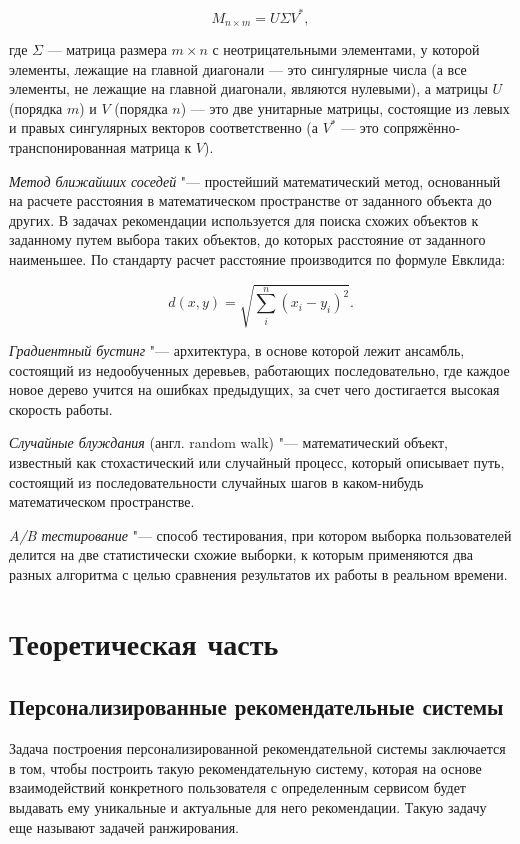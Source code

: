 \documentclass[bachelor, och, coursework]{SCWorks}
\begin{document}
\begin{equation}
    M_{n\times m} = U\Sigma V^*,
\end{equation}

где $\Sigma$  — матрица размера $m\times n$ с неотрицательными элементами, у которой элементы, лежащие на главной диагонали — это сингулярные числа (а все элементы, не лежащие на главной диагонали, являются нулевыми), а матрицы 
$U$ (порядка $m$) и $V$ (порядка $n$) — это две унитарные матрицы, состоящие из левых и правых сингулярных векторов соответственно (а
$V^*$ — это сопряжённо-транспонированная матрица к $V$).

\textit{Метод ближайших соседей} "--- простейший математический метод, основанный на расчете расстояния
в математическом пространстве от заданного объекта до других. В задачах рекомендации используется для поиска
схожих объектов к заданному путем выбора таких объектов, до которых расстояние от заданного наименьшее.
По стандарту расчет расстояние производится по формуле Евклида:

\begin{equation}
    d(x, y) = \sqrt{\sum_i^n (x_i - y_i)^2}.
\end{equation}

\textit{Градиентный бустинг} "--- архитектура, в основе которой лежит ансамбль, состоящий из недообученных деревьев,
работающих последовательно, где каждое новое дерево учится на ошибках предыдущих, за счет чего достигается высокая
скорость работы.

\textit{Случайные блуждания} (англ. random walk) "---  математический объект, известный как стохастический или случайный процесс, который описывает путь, состоящий из последовательности случайных шагов в каком-нибудь математическом пространстве.

\textit{A/B тестирование} "--- способ тестирования, при котором выборка пользователей делится на две статистически
схожие выборки, к которым применяются два разных алгоритма с целью сравнения результатов их работы в реальном времени.

\section{Теоретическая часть}
\subsection{Персонализированные рекомендательные системы}
Задача построения персонализированной рекомендательной системы заключается в том, чтобы построить такую рекомендательную
систему, которая на основе взаимодействий конкретного пользователя с определенным сервисом будет выдавать ему
уникальные и актуальные для него рекомендации. Такую задачу еще называют задачей ранжирования.
\end{document}
